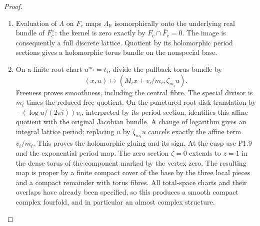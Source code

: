 \begin{proof}
\begin{enumerate}[label=\arabic*.]
\item Evaluation of $\Lambda$ on $F_c$ maps $\Lambda_{\mathbb R}$
isomorphically onto the underlying real bundle of $F_c^\vee$:
the kernel is zero exactly by $F_c\cap\bar F_c=0$.
The image is consequently a full discrete lattice.  Quotient by its
holomorphic period sections gives a holomorphic torus bundle on the
nonspecial base.

\item On a finite root chart $u^{m_i}=t_i$, divide the pullback torus bundle by
\[
(x,u)\longmapsto(M_ix+v_i/m_i,\zeta_{m_i}u).
\]
Freeness proves smoothness, including the central fibre.  The special
divisor is $m_i$ times the reduced free quotient.  On the punctured
root disk translation by
$-(\log u/(2\pi i))v_i$, interpreted by its period section, identifies
this affine quotient with the original Jacobian bundle.  A change of
logarithm gives an integral lattice period; replacing $u$ by
$\zeta_{m_i}u$ cancels exactly the affine term $v_i/m_i$.
This proves the holomorphic gluing and its sign.
At the cusp use P1.9 and the exponential period map.  The zero section
$\zeta=0$ extends to $z=1$ in the dense torus of the component marked
by the vertex zero.  The resulting map is proper by a finite compact
cover of the base by the three local pieces and a compact remainder
with torus fibres.  All total-space charts and their overlaps have
already been specified, so this produces a smooth compact complex
fourfold, and in particular an almost complex structure.


\end{enumerate}
\end{proof}
